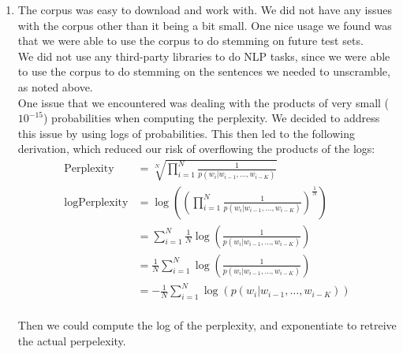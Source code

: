 \documentclass[12pt]{article}
\begin{document}
\begin{enumerate}
\begin{figure}[H]
    \end{figure}
  \item
    The corpus was easy to download and work with. We did not have any issues
    with the corpus other than it being a bit small. One nice usage we found
    was that we were able to use the corpus to do stemming on future test
    sets.\\
    We did not use any third-party libraries to do NLP tasks, since we were
    able to use the corpus to do stemming on the sentences we needed to
    unscramble, as noted above.\\
    One issue that we encountered was dealing with the products of very small
    ($10^{-15}$) probabilities when computing the perplexity. We decided to
    address this issue by using logs of probabilities. This then led to the
    following derivation, which reduced our risk of overflowing the products
    of the logs:\\
    \begin{equation}
      \begin{split}
        \text{Perplexity}&=\sqrt[N]{\prod_{i=1}^N\frac{1}{p(w_i|w_{i-1},\ldots,w_{i-K})}}\\
        \log\text{Perplexity}&=\log((\prod_{i=1}^N\frac{1}{p(w_i|w_{i-1},\ldots,w_{i-K})})^{\frac{1}{N}})\\
        &=\sum_{i=1}^N\frac{1}{N}\log(\frac{1}{p(w_i|w_{i-1},\ldots,w_{i-K})})\\
        &=\frac{1}{N}\sum_{i=1}^N\log(\frac{1}{p(w_i|w_{i-1},\ldots,w_{i-K})})\\
        &=-\frac{1}{N}\sum_{i=1}^N\log(p(w_i|w_{i-1},\ldots,w_{i-K}))\\
      \end{split}
    \end{equation}

    Then we could compute the log of the perplexity, and exponentiate to retreive
    the actual perpelexity.
\end{enumerate}
\end{document}
